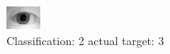 \begin{figure}[h!]
\begin{center}
\includegraphics[width=0.60\columnwidth]{figures/ID1063_class_2_target_3.png}
\end{center}
\caption{ Classification: 2 actual target: 3}
\label{fig:ID1063_class_2_target_3}
\end{figure}
